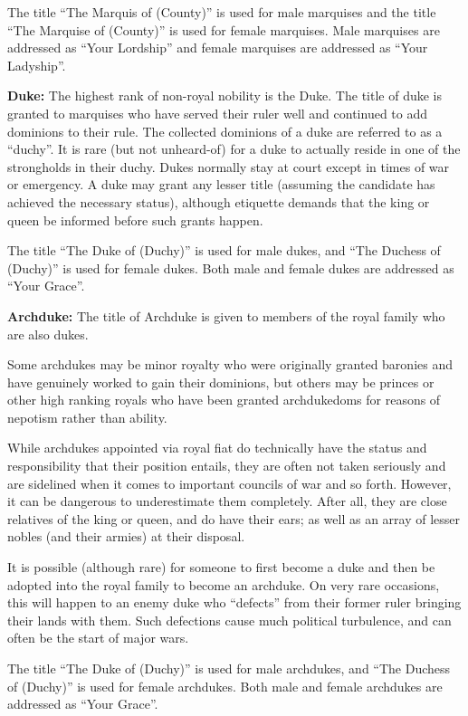 \begin{multicols*}{2}
The title “The Marquis of (County)” is used for male marquises and the title “The Marquise of (County)” is used for female marquises. Male marquises are addressed as “Your Lordship” and female marquises are addressed as “Your Ladyship”.

\textbf{Duke:} The highest rank of non-royal nobility is the Duke. The title of duke is granted to marquises who have served their ruler well and continued to add dominions to their rule. The collected dominions of a duke are referred to as a “duchy”. It is rare (but not unheard-of) for a duke to actually reside in one of the strongholds in their duchy. Dukes normally stay at court except in times of war or emergency. A duke may grant any lesser title (assuming the candidate has achieved the necessary status), although etiquette demands that the king or queen be informed before such grants happen.

The title “The Duke of (Duchy)” is used for male dukes, and “The Duchess of (Duchy)” is used for female dukes. Both male and female dukes are addressed as “Your Grace”.

\textbf{Archduke:} The title of Archduke is given to members of the royal family who are also dukes.

Some archdukes may be minor royalty who were originally granted baronies and have genuinely worked to gain their dominions, but others may be princes or other high ranking royals who have been granted archdukedoms for reasons of nepotism rather than ability.

While archdukes appointed via royal fiat do technically have the status and responsibility that their position entails, they are often not taken seriously and are sidelined when it comes to important councils of war and so forth. However, it can be dangerous to underestimate them completely. After all, they are close relatives of the king or queen, and do have their ears; as well as an array of lesser nobles (and their armies) at their disposal.

It is possible (although rare) for someone to first become a duke and then be adopted into the royal family to become an archduke. On very rare occasions, this will happen to an enemy duke who “defects” from their former ruler bringing their lands with them. Such defections cause much political turbulence, and can often be the start of major wars.

The title “The Duke of (Duchy)” is used for male archdukes, and “The Duchess of (Duchy)” is used for female archdukes. Both male and female archdukes are addressed as “Your Grace”.


\end{multicols*}

